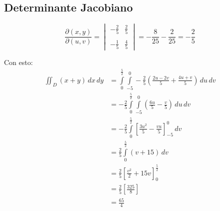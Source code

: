     \subsection*{Determinante Jacobiano}
    \[
    \frac{\partial(x, y)}{\partial(u, v)}  =  \begin{vmatrix} 
        -\frac{2}{5} & \frac{2}{5} \\ \\ 
        -\frac{1}{5} & \frac{4}{5} 
    \end{vmatrix} = -\frac{8}{25} - \frac{2}{25} = -\frac{2}{5}
    \]

    Con esto:
    \begin{align*}
        \iint_D (x+y) \, dx \, dy &= \int \limits_{0}^{\frac{5}{2}} \int \limits_{-5}^{0} -\frac{2}{5}\left(\frac{2u - 2v}{5} + \frac{4u + v}{5} \right) \, du \, dv \\
        &= -\frac{2}{5} \int \limits_{0}^{\frac{5}{2}} \int \limits_{-5}^{0}\left( \frac{6u}{5} - \frac{v}{5} \right) \, du \, dv \\
        &= -\frac{2}{5} \int \limits_{0}^{\frac{5}{2}} \left[ \frac{3u^{2}}{5} - \frac{vu}{5} \right]^{0}_{-5} \, dv \\
        &= \frac{2}{5} \int \limits_{0}^{\frac{5}{2}} (v + 15) \, dv \\
        &= \frac{2}{5} \left[ \frac{v^2}{2} + 15v \right]^{\frac{5}{2}}_{0}\\
        &= \frac{2}{5} \left[\frac{325}{8}\right] \\
        &= \frac{65}{4}
    \end{align*}
